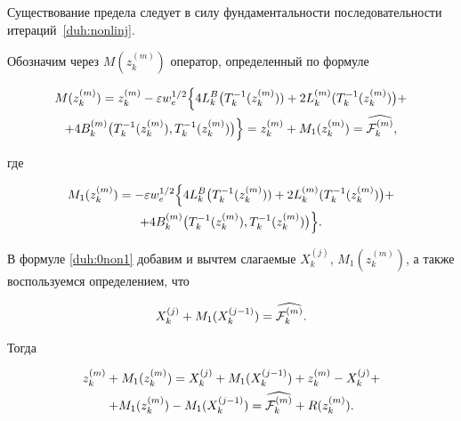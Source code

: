 Существование предела следует в силу фундаментальности последовательности итераций~\eqref{duh:nonlinj}.

Обозначим через $M(z^{(m)}_k)$ оператор, определенный по формуле

\begin{multline}

M(z^{(m)}_k)=z^{(m)}_k-

\varepsilon w_e^{1/2}\Bigl\{4 L_k^B \bigl(T^{-1}_k(z^{(m)}_k))+2L^{(m)}_k(T^{-1}_k(z^{(m)}_k)\bigr)+

\\

+4B^{(m)}_k \bigl(T^{-1}_k(z^{(m)}_k), T^{-1}_k(z^{(m)}_k)\bigr)\Bigr\}=z^{(m)}_k+M_1(z^{(m)}_k)=\widehat{{\cal F}^{(m)}_k},

\label{duh:0non1}

\end{multline}

где 

\begin{multline*}

M_1(z^{(m)}_k)=-\varepsilon w_e^{1/2}

\Bigl\{4 L_k^B \bigl(T^{-1}_k(z^{(m)}_k))+2L^{(m)}_k(T^{-1}_k(z^{(m)}_k)\bigr)+

\\

+4B^{(m)}_k \bigl(T^{-1}_k(z^{(m)}_k), T^{-1}_k(z^{(m)}_k)\bigr)\Bigr\}.

\end{multline*}

В формуле \eqref{duh:0non1} добавим и вычтем слагаемые $X^{(j)}_k$, $M_1(z^{(m)}_k)$, а также воспользуемся определением, что 

$$

X^{(j)}_k+M_1(X^{(j-1)}_k)=\widehat{{\cal F}^{(m)}_k}.

$$

Тогда

\begin{multline}

z^{(m)}_k+M_1(z^{(m)}_k)=X^{(j)}_k+M_1(X^{(j-1)}_k)+z^{(m)}_k-X^{(j)}_k+ 

\\

+M_1(z^{(m)}_k)-M_1(X^{(j-1)}_k)

=\widehat{{\cal F}^{(m)}_k}+R(z^{(m)}_k).

\label{duh:eqM}

\end{multline}

